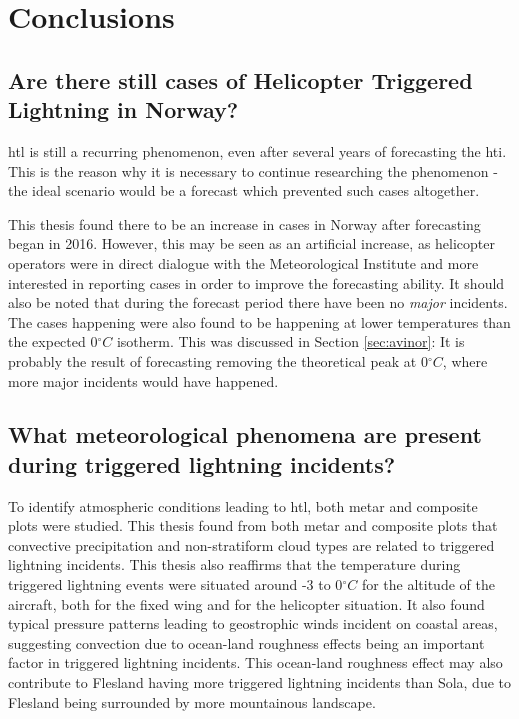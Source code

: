 \chapter{Conclusions}
\section{Are there still cases of Helicopter Triggered Lightning in Norway?}
\acrlong{htl} is still a recurring phenomenon, even after several years of forecasting the \acrlong{hti}. This is the reason why it is necessary to continue researching the phenomenon - the ideal scenario would be a forecast which prevented such cases altogether. 

This thesis found there to be an increase in cases in Norway after forecasting began in 2016. However, this may be seen as an artificial increase, as helicopter operators were in direct dialogue with the Meteorological Institute and more interested in reporting cases in order to improve the forecasting ability. It should also be noted that during the forecast period there have been no \textit{major} incidents. The cases happening were also found to be happening at lower temperatures than the expected 0$^{\circ}C$ isotherm. This was discussed in Section \ref{sec:avinor}: It is probably the result of forecasting removing the theoretical peak at 0$^{\circ}C$, where more major incidents would have happened.

\section{What meteorological phenomena are present during triggered lightning incidents?}
To identify atmospheric conditions leading to \acrshort{htl}, both \acrshort{metar} and composite plots were studied. This thesis found from both \acrshort{metar} and composite plots that convective precipitation and non-stratiform cloud types are related to triggered lightning incidents. This thesis also reaffirms that the temperature during triggered lightning events were situated around -3 to 0$^{\circ}C$ for the altitude of the aircraft, both for the fixed wing and for the helicopter situation. It also found typical pressure patterns leading to geostrophic winds incident on coastal areas, suggesting convection due to ocean-land roughness effects being an important factor in triggered lightning incidents. This ocean-land roughness effect may also contribute to Flesland having more triggered lightning incidents than Sola, due to Flesland being surrounded by more mountainous landscape.

